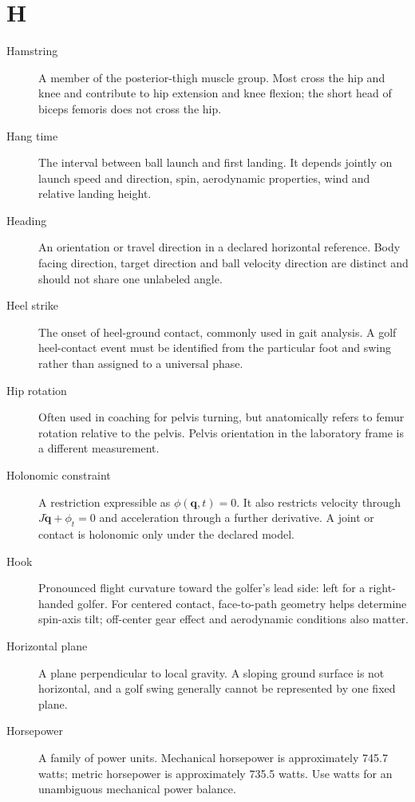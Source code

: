 \section*{H}
\begin{description}

\item[Hamstring] A member of the posterior-thigh muscle group. Most cross the hip and knee and contribute to hip extension and knee flexion; the short head of biceps femoris does not cross the hip.

\item[Hang time] The interval between ball launch and first landing. It depends jointly on launch speed and direction, spin, aerodynamic properties, wind and relative landing height.

\item[Heading] An orientation or travel direction in a declared horizontal reference. Body facing direction, target direction and ball velocity direction are distinct and should not share one unlabeled angle.

\item[Heel strike] The onset of heel-ground contact, commonly used in gait analysis. A golf heel-contact event must be identified from the particular foot and swing rather than assigned to a universal phase.

\item[Hip rotation] Often used in coaching for pelvis turning, but anatomically refers to femur rotation relative to the pelvis. Pelvis orientation in the laboratory frame is a different measurement.

\item[Holonomic constraint] A restriction expressible as $\phi(\mathbf{q},t)=0$. It also restricts velocity through $J\dot{\mathbf{q}}+\phi_t=0$ and acceleration through a further derivative. A joint or contact is holonomic only under the declared model.

\item[Hook] Pronounced flight curvature toward the golfer's lead side: left for a right-handed golfer. For centered contact, face-to-path geometry helps determine spin-axis tilt; off-center gear effect and aerodynamic conditions also matter.

\item[Horizontal plane] A plane perpendicular to local gravity. A sloping ground surface is not horizontal, and a golf swing generally cannot be represented by one fixed plane.

\item[Horsepower] A family of power units. Mechanical horsepower is approximately 745.7 watts; metric horsepower is approximately 735.5 watts. Use watts for an unambiguous mechanical power balance.


\end{description}
